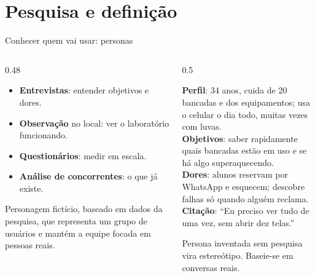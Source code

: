 \documentclass[aspectratio=169,10pt]{beamer}
\begin{document}
\section{Pesquisa e definição}

\begin{frame}{Conhecer quem vai usar: personas}
  \begin{columns}[T]
    \begin{column}{0.48\textwidth}
      \begin{conceito}
        \begin{itemize}
          \item \textbf{Entrevistas}: entender objetivos e dores.
          \item \textbf{Observação} no local: ver o laboratório funcionando.
          \item \textbf{Questionários}: medir em escala.
          \item \textbf{Análise de concorrentes}: o que já existe.
        \end{itemize}
      \end{conceito}
      \begin{definicao}[Persona]
        Personagem fictício, baseado em dados da pesquisa, que representa um grupo de usuários e mantém a equipe focada em pessoas reais.
      \end{definicao}
    \end{column}
    \begin{column}{0.5\textwidth}
      \begin{exemplo}
        \scriptsize
        \textbf{Perfil}: 34 anos, cuida de 20 bancadas e dos equipamentos; usa o celular o dia todo, muitas vezes com luvas.\\[2pt]
        \textbf{Objetivos}: saber rapidamente quais bancadas estão em uso e se há algo superaquecendo.\\[2pt]
        \textbf{Dores}: alunos reservam por WhatsApp e esquecem; descobre falhas só quando alguém reclama.\\[2pt]
        \textbf{Citação}: ``Eu preciso ver tudo de uma vez, sem abrir dez telas.''
      \end{exemplo}
      \begin{atencao}
        Persona inventada sem pesquisa vira estereótipo. Baseie-se em conversas reais.
      \end{atencao}
    \end{column}
  \end{columns}
\end{frame}
\end{document}

